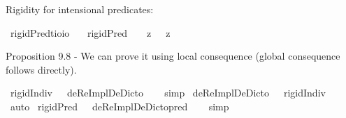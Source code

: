\begin{isabellebody}
\begin{isamarkuptext}%
Rigidity for intensional predicates:%
\end{isamarkuptext}\isamarkuptrue%
\isamarkupfalse%
\ rigidPred{\isacharcolon}{\isacharcolon}{\isachardoublequoteopen}{\isacharparenleft}{\isacharprime}t{\isasymRightarrow}io{\isacharparenright}{\isasymRightarrow}io{\isachardoublequoteclose}\ \isanewline
\ \ {\isachardoublequoteopen}rigidPred\ {\isasymtau}\ {\isasymequiv}\ {\isacharparenleft}{\isasymlambda}{\isasymbeta}{\isachardot}\ \isactrlbold {\isasymbox}{\isacharparenleft}{\isacharparenleft}{\isasymlambda}z{\isachardot}\ {\isasymbeta}\ \isactrlbold {\isasymapprox}\ z{\isacharparenright}\ \isactrlbold {\isasymdown}{\isasymtau}{\isacharparenright}{\isacharparenright}\ \isactrlbold {\isasymdown}{\isasymtau}{\isachardoublequoteclose}%
\begin{isamarkuptext}%
Proposition 9.8 - We can prove it using local consequence (global consequence follows directly).%
\end{isamarkuptext}\isamarkuptrue%
\isamarkupfalse%
\ {\isachardoublequoteopen}{\isasymlfloor}rigidIndiv\ {\isacharparenleft}{\isasymtau}{\isacharcolon}{\isacharcolon}{\isasymup}{\isasymzero}{\isacharparenright}\ \isactrlbold {\isasymrightarrow}\ deReImplDeDicto\ {\isasymtau}{\isasymrfloor}{\isachardoublequoteclose}%
\isadelimproof
\ %
\endisadelimproof
%
\isatagproof
{}\isamarkupfalse%
\ simp%
\endisatagproof
{\isafoldproof}%
%
\isadelimproof
%
\endisadelimproof
\isanewline
{}\isamarkupfalse%
\ {\isachardoublequoteopen}{\isasymlfloor}deReImplDeDicto\ {\isacharparenleft}{\isasymtau}{\isacharcolon}{\isacharcolon}{\isasymup}{\isasymzero}{\isacharparenright}\ \isactrlbold {\isasymrightarrow}\ rigidIndiv\ {\isasymtau}{\isasymrfloor}{\isachardoublequoteclose}%
\isadelimproof
\ %
\endisadelimproof
%
\isatagproof
{}\isamarkupfalse%
\ auto%
\endisatagproof
{\isafoldproof}%
%
\isadelimproof
%
\endisadelimproof
\isanewline
{}\isamarkupfalse%
\ {\isachardoublequoteopen}{\isasymlfloor}rigidPred\ {\isacharparenleft}{\isasymtau}{\isacharcolon}{\isacharcolon}{\isasymup}{\isasymlangle}{\isasymzero}{\isasymrangle}{\isacharparenright}\ \isactrlbold {\isasymrightarrow}\ deReImplDeDicto{\isacharunderscore}pred\ {\isasymtau}{\isasymrfloor}{\isachardoublequoteclose}%
\isadelimproof
\ %
\endisadelimproof
%
\isatagproof
{}\isamarkupfalse%
\ simp%
\endisatagproof
{\isafoldproof}%
%
\isadelimproof
%
\endisadelimproof
\isanewline
{}\isamarkupfalse%

\end{isabellebody}
